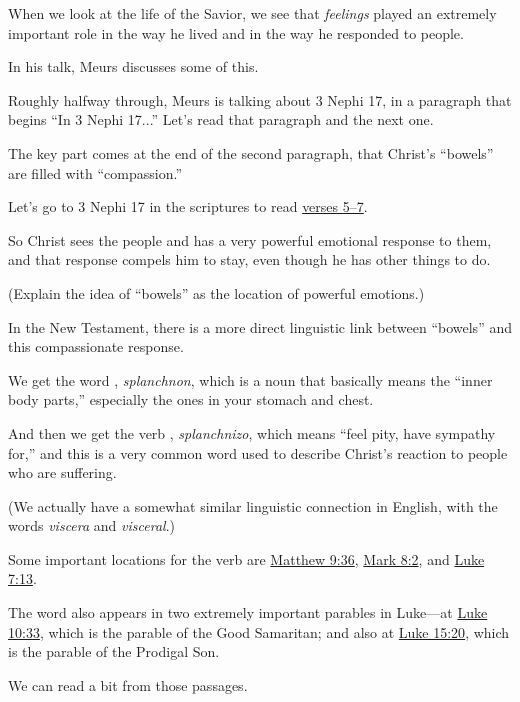 \begin{compactitem}
			\item When we look at the life of the Savior, we see that \textit{feelings} played an extremely important role in the way he lived and in the way he responded to people.
				\begin{compactitem}
					\item In his talk, Meurs discusses some of this.
					\item Roughly halfway through, Meurs is talking about 3 Nephi 17, in a paragraph that begins ``In 3 Nephi 17...'' Let's read that paragraph and the next one.
					\item The key part comes at the end of the second paragraph, that Christ's ``bowels'' are filled with ``compassion.''
					\item Let's go to 3 Nephi 17 in the scriptures to read \hyperref[3NEPHI-17-5]{verses 5--7}.
					\item So Christ sees the people and has a very powerful emotional response to them, and that response compels him to stay, even though he has other things to do.
					\item (Explain the idea of ``bowels'' as the location of powerful emotions.)
					\item In the New Testament, there is a more direct linguistic link between ``bowels'' and this compassionate response.
						\begin{compactitem}
							\item We get the word , \textit{splanchnon}, which is a noun that basically means the ``inner body parts,'' especially the ones in your stomach and chest.
							\item And then we get the verb , \textit{splanchnizo}, which means ``feel pity, have sympathy for,'' and this is a very common word used to describe Christ's reaction to people who are suffering.
							\item (We actually have a somewhat similar linguistic connection in English, with the words \textit{viscera} and \textit{visceral}.)
							\item Some important locations for the verb are \hyperref[MATTHEW-9-36]{Matthew 9:36}, \hyperref[MARK-8-2]{Mark 8:2}, and \hyperref[LUKE-7-13]{Luke 7:13}.
							\item The word also appears in two extremely important parables in Luke---at \hyperref[LUKE-10-33]{Luke 10:33}, which is the parable of the Good Samaritan; and also at \hyperref[LUKE-15-20]{Luke 15:20}, which is the parable of the Prodigal Son.
							\item We can read a bit from those passages.

\end{compactitem}
\end{compactitem}
\end{compactitem}
